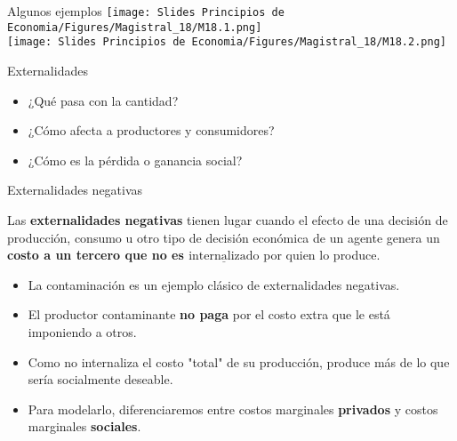 \documentclass{beamer}
\begin{document}

\begin{frame}{Algunos ejemplos}
\centering  
\texttt{[image: Slides Principios de Economia/Figures/Magistral\_18/M18.1.png]} \\
\vspace{5mm}
\texttt{[image: Slides Principios de Economia/Figures/Magistral\_18/M18.2.png]} 

\end{frame}

\begin{frame}{Externalidades}
    \begin{itemize}
        \item ¿Qué pasa con la cantidad?
                    \vspace{2mm}
        \item ¿Cómo afecta a productores y consumidores?
                    \vspace{2mm}
        \item ¿Cómo es la pérdida o ganancia social?
    \end{itemize}
\end{frame}

\begin{frame}{Externalidades negativas}
    \begin{boxB}
        \centering
        Las \textbf{externalidades negativas} tienen lugar cuando el efecto de una decisión de producción, consumo u otro tipo de decisión económica de un agente genera un \textbf{costo a un tercero que no es
        $\underline{\text{internalizado}}$} por quien lo produce.
    \end{boxB}
    \begin{itemize}
        \item La contaminación es un ejemplo clásico de externalidades negativas.
        \item El productor contaminante \textbf{no paga} por el costo extra que le está imponiendo a otros.
        \item Como no internaliza el costo "total" de su producción, produce más de lo que sería socialmente deseable.
        \item Para modelarlo, diferenciaremos entre costos marginales \textbf{privados} y costos marginales \textbf{sociales}.
    \end{itemize}
\end{frame}
\end{document}
